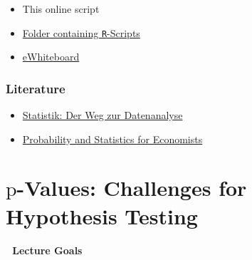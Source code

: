 \documentclass[
  letterpaper,
  DIV=11,
  numbers=noendperiod]{scrreprt}
\providecommand{\tightlist}{%
  \setlength{\itemsep}{0pt}\setlength{\parskip}{0pt}}\usepackage{longtable,booktabs,array}
\begin{document}
\begin{itemize}
\tightlist
\item
  This online script
\item
  \href{https://www.dropbox.com/scl/fo/omfqxytalaiyx4kd0kv4o/AE7EhUu8W3dJPvaA_ETDlQM?rlkey=w6v0am29ypq38gt4xpzy230bj&st=8p60234i&dl=0}{Folder
  containing \texttt{R}-Scripts}
\item
  \href{https://www.dropbox.com/scl/fi/vnzws3xkbs2ojd5mfcdxr/CASA_eWhiteboard_2526_annotated.pdf?rlkey=ny3rnruqrsyyy1j4i2z3rdoek&st=djjulif7&dl=0}{eWhiteboard}
\end{itemize}

\subsection*{Literature}\label{literature}

\begin{itemize}
\tightlist
\item
  \href{https://link.springer.com/book/10.1007/978-3-662-67526-7}{Statistik:
  Der Weg zur Datenanalyse}
\item
  \href{https://press.princeton.edu/books/hardcover/9780691235943/probability-and-statistics-for-economists?srsltid=AfmBOopn6HIW0Y1Edtu1W8VdiDmPN6PfNiCwHmyTBjQEHqM5i3W4ysVK}{Probability
  and Statistics for Economists}
\end{itemize}

\newcommand{\highlight}[2][yellow]{\mathchoice%
  {\colorbox{#1}{$\displaystyle#2$}}%
  {\colorbox{#1}{$\displaystyle#2$}}%
  {\colorbox{#1}{$\displaystyle#2$}}%
  }%


\chapter{\texorpdfstring{\(\mathrm{p}\)-Values: Challenges for
Hypothesis
Testing}{\textbackslash mathrm\{p\}-Values: Challenges for Hypothesis Testing}}\label{mathrmp-values-challenges-for-hypothesis-testing}

\subsubsection*{\texorpdfstring{🎯 \textbf{Lecture
Goals}}{🎯 Lecture Goals}}\label{lecture-goals}
\end{document}
